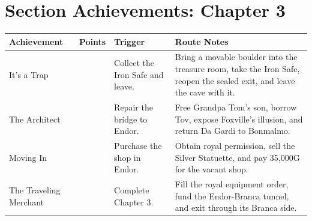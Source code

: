 \documentclass[
  american,
  10pt,
  letterpaper,
  oneside,
  open=any]{scrreprt}
\newcounter{none} %
\newenvironment{guidetable}{%
  \small\setstretch{1.0}%
  \setlength{\tabcolsep}{4pt}%
  \setlength{\LTpre}{8pt}\setlength{\LTpost}{10pt}%
  \renewcommand{\arraystretch}{1.16}%
}{ }
\begin{document}
\section{Section Achievements: Chapter
3}\label{section-achievements-chapter-3}

\begin{guidetable}

{\def\LTcaptype{none} %
\begin{longtable}[]{@{}
  >{\raggedright\arraybackslash}p{}
  >{\raggedleft\arraybackslash}p{}
  >{\raggedright\arraybackslash}p{}
  >{\raggedright\arraybackslash}p{}@{}}
\toprule\noalign{}
\begin{minipage}[b]{\linewidth}\raggedright
\color{GuideGreen}\bfseries Achievement
\end{minipage} & \begin{minipage}[b]{\linewidth}\raggedleft
\color{GuideGreen}\bfseries Points
\end{minipage} & \begin{minipage}[b]{\linewidth}\raggedright
\color{GuideGreen}\bfseries Trigger
\end{minipage} & \begin{minipage}[b]{\linewidth}\raggedright
\color{GuideGreen}\bfseries Route Notes
\end{minipage} \\
\midrule\noalign{}
\endhead
\bottomrule\noalign{}
\endlastfoot
It's a Trap & 5 & Collect the Iron Safe and leave. & Bring a movable
boulder into the treasure room, take the Iron Safe, reopen the sealed
exit, and leave the cave with it. \\
The Architect & 5 & Repair the bridge to Endor. & Free Grandpa Tom's
son, borrow Tov, expose Foxville's illusion, and return Da Gardi to
Bonmalmo. \\
Moving In & 5 & Purchase the shop in Endor. & Obtain royal permission,
sell the Silver Statuette, and pay 35,000G for the vacant shop. \\
The Traveling Merchant & 10 & Complete Chapter 3. & Fill the royal
equipment order, fund the Endor-Branca tunnel, and exit through its
Branca side. \\
\end{longtable}
}

\end{guidetable}
\end{document}
